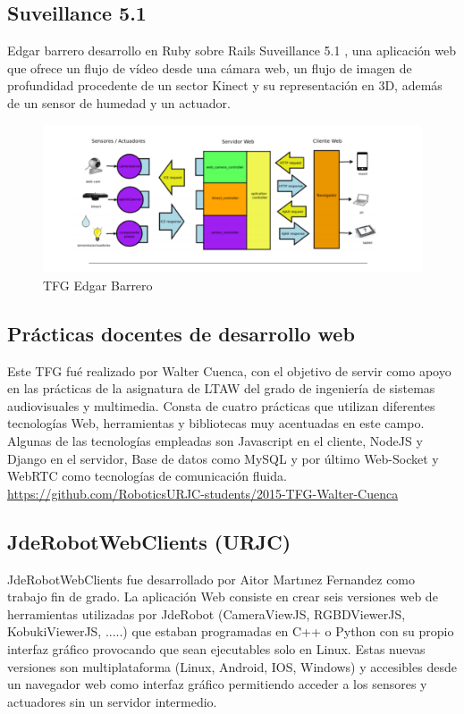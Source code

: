 \subsection*{Suveillance 5.1}
Edgar barrero desarrollo en Ruby sobre Rails Suveillance 5.1 \cite{TFGsurveillance5.1}\cite{surveillance5.1}, una aplicación web que ofrece un flujo de vídeo desde una cámara web, un flujo de imagen de profundidad procedente de un sector Kinect y su representación en 3D, además de un sensor de humedad y un actuador.


\begin{figure}[!h]
    \centering
    \includegraphics[width=150mm]{img/introduccion/edgar.png}
    \caption{TFG Edgar Barrero}
\end{figure}

\subsection*{Prácticas docentes de desarrollo web}
Este TFG\cite{TFGPracticasDesarrolloWeb}\cite{PracticasDesarrolloWeb} fué realizado por Walter Cuenca, con el objetivo de servir como apoyo en las prácticas de la asignatura de LTAW del grado de ingeniería de sistemas audiovisuales y multimedia. Consta de cuatro prácticas que utilizan diferentes tecnologías Web, herramientas y bibliotecas muy acentuadas en este campo. Algunas de las tecnologías empleadas son Javascript en el cliente, NodeJS y Django en el servidor, Base de datos como MySQL y por último Web-Socket y WebRTC como tecnologías de comunicación fluida.
\url{https://github.com/RoboticsURJC-students/2015-TFG-Walter-Cuenca}


\subsection*{JdeRobotWebClients (URJC)}
JdeRobotWebClients \cite{TFGJdeRobotWebClients}\cite{JdeRobotWebClients}fue desarrollado por Aitor Martınez Fernandez como trabajo fin de grado. La aplicación Web consiste en crear seis versiones web de herramientas utilizadas por JdeRobot (CameraViewJS, RGBDViewerJS, KobukiViewerJS, .....) que estaban programadas en C++ o Python con su propio interfaz gráfico provocando que sean ejecutables solo en Linux.
Estas nuevas versiones son multiplataforma (Linux, Android, IOS, Windows) y accesibles desde un navegador web como interfaz gráfico permitiendo acceder a los sensores y actuadores sin un servidor intermedio.

